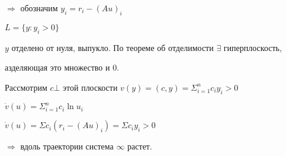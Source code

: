 \documentclass{article}
\begin{document}
\begin{large}
$\Longrightarrow$ обозначим $y_i = r_i - (Au)_i$

$L = \lbrace y : y_i>0\rbrace$

$y $ отделено от нуля, выпукло. По теореме об отделимости $ \exists $ гиперплоскость, 

азделяющая это множество и 0.

\vspace{0.5cm}
Рассмотрим $ c \bot $ этой плоскости $v(y) = (c,y) = \Sigma_{i=1}^n c_i y_i > 0$

$ \dot{v}(u) = \Sigma_{i=1}^n c_i \ln u_i $

$ \dot{v}(u) = \Sigma c_i(r_i - (Au)_i) = \Sigma c_i y_i > 0 $

$\Rightarrow$ вдоль траектории система $\infty$ растет.









\end{large}
\end{document}
